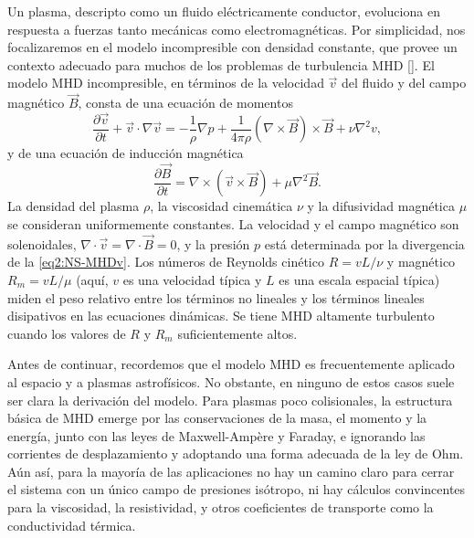 Un plasma, descripto como un fluido eléctricamente conductor,
evoluciona en respuesta a fuerzas tanto mecánicas como
electromagnéticas. Por simplicidad, nos focalizaremos en el modelo
incompresible con densidad constante, que provee un contexto adecuado
para muchos de los problemas de turbulencia MHD
[\cite{biskamp_magnetohydrodynamic_2003}]. El modelo MHD incompresible,
en términos de la velocidad $\vec{v}$ del fluido y del campo magnético
$\vec{B}$, consta de una ecuación de momentos
\begin{equation}\label{eq2:NS-MHDv}
  \frac{\partial \vec{v}}{\partial t} + \vec{v} \cdot \nabla\vec{v} = -\frac{1}{\rho} \nabla p + \frac{1}{4\pi\rho} \left(\nabla\times\vec{B}\right)\times\vec{B} + \nu \nabla^2 v,
\end{equation}
y de una ecuación de inducción magnética
\begin{equation}\label{eq2:NS-MHDB}
  \frac{\partial \vec{B}}{\partial t} = \nabla \times \left(\vec{v}\times\vec{B}\right) + \mu \nabla^2 \vec{B}.
\end{equation}
La densidad del plasma $\rho$, la viscosidad cinemática $\nu$ y la
difusividad magnética $\mu$ se consideran uniformemente constantes. La
velocidad y el campo magnético son solenoidales, $\nabla\cdot\vec{v}
= \nabla\cdot\vec{B} = 0$, y la presión $p$ está determinada por la
divergencia de la \cref{eq2:NS-MHDv}. Los números de Reynolds cinético
$R = vL/\nu$ y magnético $R_m = vL/\mu$ (aquí, $v$ es una velocidad
típica y $L$ es una escala espacial típica) miden el peso relativo
entre los términos no lineales y los términos lineales disipativos en
las ecuaciones dinámicas. Se tiene MHD altamente turbulento cuando los
valores de $R$ y $R_m$ suficientemente altos.

Antes de continuar, recordemos que el modelo MHD es frecuentemente
aplicado al espacio y a plasmas astrofísicos. No obstante, en ninguno
de estos casos suele ser clara la derivación del modelo. Para plasmas
poco colisionales, la estructura básica de MHD emerge por las
conservaciones de la masa, el momento y la energía, junto con las
leyes de Maxwell-Ampère y Faraday, e ignorando las corrientes de
desplazamiento y adoptando una forma adecuada de la ley de Ohm. Aún
así, para la mayoría de las aplicaciones no hay un camino claro para
cerrar el sistema con un único campo de presiones isótropo, ni hay
cálculos convincentes para la viscosidad, la resistividad, y otros
coeficientes de transporte como la conductividad térmica.

